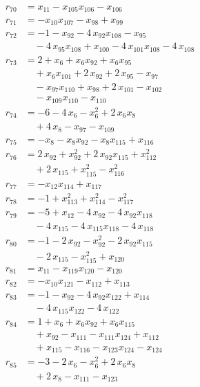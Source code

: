 \begin{align*}
r_{70} &= x_{11} - x_{105} x_{106} - x_{106} \\
r_{71} &= -x_{10} x_{107} - x_{98} + x_{99} \\
r_{72} &= -1 - x_{92} - 4\,x_{92} x_{108} - x_{95} \\
&\quad{}- 4\,x_{95} x_{108} + x_{100} - 4\,x_{101} x_{108} - 4\,x_{108} \\
r_{73} &= 2 + x_{6} + x_{6} x_{92} + x_{6} x_{95} \\
&\quad{}+ x_{6} x_{101} + 2\,x_{92} + 2\,x_{95} - x_{97} \\
&\quad{}- x_{97} x_{110} + x_{98} + 2\,x_{101} - x_{102} \\
&\quad{}- x_{109} x_{110} - x_{110} \\
r_{74} &= -6 - 4\,x_{6} - x_{6}^{2} + 2\,x_{6} x_{8} \\
&\quad{}+ 4\,x_{8} - x_{97} - x_{109} \\
r_{75} &= -x_{8} - x_{8} x_{92} - x_{8} x_{115} + x_{116} \\
r_{76} &= 2\,x_{92} + x_{92}^{2} + 2\,x_{92} x_{115} + x_{112}^{2} \\
&\quad{}+ 2\,x_{115} + x_{115}^{2} - x_{116}^{2} \\
r_{77} &= -x_{12} x_{114} + x_{117} \\
r_{78} &= -1 + x_{113}^{2} + x_{114}^{2} - x_{117}^{2} \\
r_{79} &= -5 + x_{12} - 4\,x_{92} - 4\,x_{92} x_{118} \\
&\quad{}- 4\,x_{115} - 4\,x_{115} x_{118} - 4\,x_{118} \\
r_{80} &= -1 - 2\,x_{92} - x_{92}^{2} - 2\,x_{92} x_{115} \\
&\quad{}- 2\,x_{115} - x_{115}^{2} + x_{120} \\
r_{81} &= x_{11} - x_{119} x_{120} - x_{120} \\
r_{82} &= -x_{10} x_{121} - x_{112} + x_{113} \\
r_{83} &= -1 - x_{92} - 4\,x_{92} x_{122} + x_{114} \\
&\quad{}- 4\,x_{115} x_{122} - 4\,x_{122} \\
r_{84} &= 1 + x_{6} + x_{6} x_{92} + x_{6} x_{115} \\
&\quad{}+ x_{92} - x_{111} - x_{111} x_{124} + x_{112} \\
&\quad{}+ x_{115} - x_{116} - x_{123} x_{124} - x_{124} \\
r_{85} &= -3 - 2\,x_{6} - x_{6}^{2} + 2\,x_{6} x_{8} \\
&\quad{}+ 2\,x_{8} - x_{111} - x_{123} \\

\end{align*}
